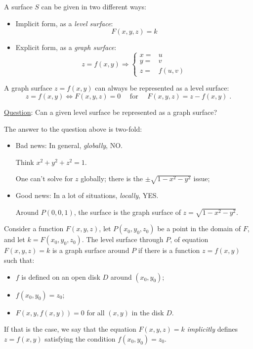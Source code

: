 A surface $S$ can be given in two different ways:

\begin{itemize}
  \item Implicit form, as a \emph{level surface}:
  $$F(x,y,z) = k$$
  \item  Explicit form, as a \emph{graph surface}:
  $$z=f(x,y) \Longrightarrow \left\{ \begin{array}{ll}
    x = & u \\
    y = & v \\
    z = & f(u,v)
  \end{array} \right.$$
\end{itemize}

A graph surface $z=f(x,y)$ can always be represented as a level surface:
%
$$z=f(x,y) \Longleftrightarrow F(x,y,z) =0 \quad \text{ for } \quad F(x,y,z) = z-f(x,y)\; .$$

\underline{Question}: Can a given level surface be represented as a graph surface?

The answer to the question above is two-fold:

\begin{itemize}
  \item Bad news: In general, \emph{globally}, NO.

  \noindent Think $x^2+y^2+z^2= 1$.

  One can't solve for $z$ globally; there is the $\pm\sqrt{1-x^2-y^2}$ issue;
  \item Good news: In a lot of situations, \emph{locally}, YES.

  \noindent Around $P(0,0,1)$, the surface is the graph surface of $z = \sqrt{1-x^2-y^2}$.
\end{itemize}

Consider a function $F(x,y,z)$, let $P(x_0,y_0,z_0)$ be a point in the domain of $F$, and let $k=F(x_0,y_0,z_0)$. The level surface through $P$, of equation $F(x,y,z) = k$ is a graph surface around $P$ if there is a function $z=f(x,y)$ such that:
%
\begin{itemize}
  \item $f$ is defined on an open disk $D$ around $(x_0,y_0)$;
  \item $f(x_0,y_0) = z_0$;
  \item $F(x,y,f(x,y)) = 0$ for all $(x,y)$ in the disk $D$.
\end{itemize}

If that is the case, we say that the equation $F(x,y,z) = k$ \emph{implicitly} defines $z=f(x,y)$ satisfying the condition $f(x_0,y_0) = z_0$.

